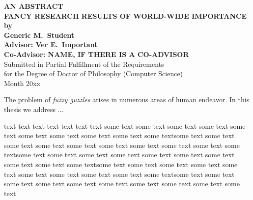 \vspace*{3ex plus 0.6fil}
\begin{center}

{\large\bf
   AN ABSTRACT\\[3ex]
   FANCY RESEARCH RESULTS OF WORLD-WIDE IMPORTANCE\\[2ex]
   by\\[3ex]
   Generic M.\ Student\\[3ex]
   Advisor: Ver E.\ Important\\[2ex]
   Co-Advisor: NAME, IF THERE IS A CO-ADVISOR
}\\[3ex]
Submitted in Partial Fulfillment of the Requirements\\[2ex]
for the Degree of Doctor of Philosophy (Computer Science)\\[3ex]
Month 20xx
\end{center}

\vspace*{2.5ex}

The problem of \emph{fuzzy guzzles} arises in numerous areas of human
endeavor.  In this thesis we address ...

text text text text text text text some text some text some text some
text some text some text some text some text some text some textsome
text some text some text some text some text some text some text some
text some text some textsome text some text some text some text some
text some text some text some text some text some textsome text some
text some text some text some text some text some text some text some
text some textsome text some text some text some text some text some
text some text some text some text some text

\vspace*{3ex plus 1fil}